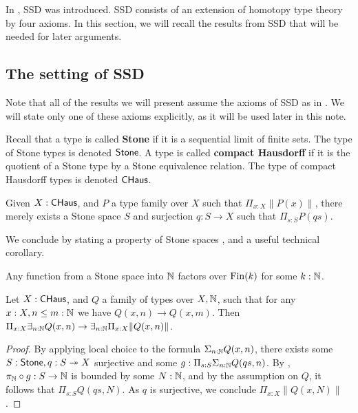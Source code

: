 In \cite{synthetic-stone-duality}, SSD was introduced. SSD consists of an extension of homotopy type theory \cite{hott} by four axioms. In this section, we will recall the results from SSD that will be needed for later arguments. 

\subsection{The setting of SSD}
Note that all of the results we will present assume the axioms of SSD as in \cite{synthetic-stone-duality}. We will state only one of these axioms explicitly, as it will be used later in this note. %
\begin{definition}
  Recall that a type is called \textbf{Stone} if it is 
  a sequential limit of finite sets. The type of Stone types is denoted $\mathsf{Stone}$. 
  A type is called \textbf{compact Hausdorff} if it is the quotient of a Stone type by a Stone equivalence relation. The type of compact Hausdorff types is denoted $\mathsf{CHaus}$. 
\end{definition}
  
\begin{axiom}\label{AxLocalChoice}
  Given $X:\mathsf{CHaus}$, and $P$ a type family over $X$ such that $\Pi_{x:X} \|P(x)\|$, there merely exists a Stone space $S$ and surjection $q:S \to X$ such that $\Pi_{s:S}P(qs)$.  
\end{axiom}
We conclude by stating a property of Stone spaces \parencite[Lemma 3.6]{synthetic-stone-duality}, and a useful technical corollary. 
\begin{lemma}\label{Boundedness}
  Any function from a Stone space into $\mathbb{N}$ factors over $\operatorname{Fin}(k)$ for some $k:\mathbb{N}$. 
\end{lemma}
\begin{corollary}\label{chooseMaxNTrick}
  Let $X:\mathsf{CHaus}$, and $Q$ a family of types over $X,\mathbb{N}$, 
  such that for any $x:X,n\leq m:\mathbb{N}$ we have $Q(x,n)\to Q(x,m)$. 
  Then $\Pi_{x:X}\exists_{n:\mathbb{N}}Q(x,n)\to \exists_{n:\mathbb{N}}\Pi_{x:X}\|Q(x,n)\|$. 
\end{corollary}
\begin{proof}
  By applying local choice to the formula $\Sigma_{n:\mathbb{N}}Q(x,n)$,
  there exists some $S:\mathsf{Stone}, q:S\twoheadrightarrow X$ surjective and some $g:\Pi_{s:S}\Sigma_{n:\mathbb{N}}Q(qs,n)$. 
  By , $\pi_{\mathbb{N}}\circ g : S \to \mathbb{N}$ is bounded by some $N:\mathbb{N}$, and by the assumption on $Q$, it follows that $\Pi_{s:S}Q(qs,N)$. As $q$ is surjective, we conclude $\Pi_{x:X}\|Q(x,N)\|$. 
\end{proof}

